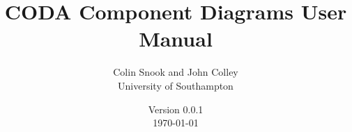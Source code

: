 \documentclass[a4paper,10pt]{article}
\title{CODA Component Diagrams User Manual}
\author{Colin Snook and John Colley\\University of Southampton}
\date{%
  Version 0.0.1\\%
  \today%
}
\begin{document}
\ifplastex%
\maketitle%
\else%
 \ifstandalone%
 \maketitle %
 \else%
 \fi%
\fi%



%
%
%
%
%
%
%
%
%


\end{document}
